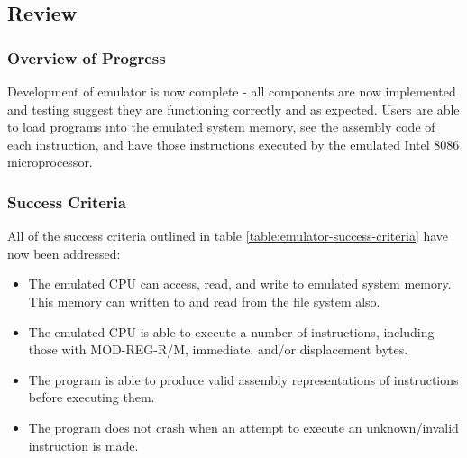 \subsection{Review}
    \subsubsection{Overview of Progress}
        Development of emulator is now complete - all components are now implemented and testing suggest they are functioning correctly and as expected. Users are able to load programs into the emulated system memory, see the assembly code of each instruction, and have those instructions executed by the emulated Intel 8086 microprocessor.

    \subsubsection{Success Criteria}
        All of the success criteria outlined in table \ref{table:emulator-success-criteria} have now been addressed:
        \begin{itemize}
            \item The emulated CPU can access, read, and write to emulated system memory. This memory can written to and read from the file system also.
            \item The emulated CPU is able to execute a number of instructions, including those with MOD-REG-R/M, immediate, and/or displacement bytes.
            \item The program is able to produce valid assembly representations of instructions before executing them.
            \item The program does not crash when an attempt to execute an unknown/invalid instruction is made.
        \end{itemize}
